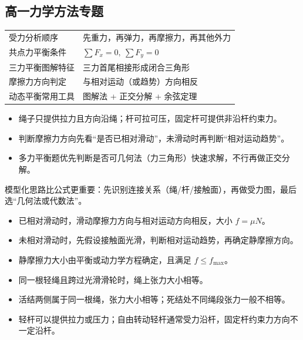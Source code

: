 \subsection{高一力学方法专题}
\begin{tabularx}{\columnwidth}{XX}
  受力分析顺序 & 先重力，再弹力，再摩擦力，再其他外力 \\
  共点力平衡条件 & $\sum F_x=0,\ \sum F_y=0$ \\
  三力平衡图解特征 & 三力首尾相接形成闭合三角形 \\
  摩擦力方向判定 & 与相对运动（或趋势）方向相反 \\
  动态平衡常用工具 & 图解法 + 正交分解 + 余弦定理 \\
\end{tabularx}

\begin{formulanotebox}
\begin{itemize}[leftmargin=1.5em]
  \item 绳子只提供拉力且方向沿绳；杆可拉可压，固定杆可提供非沿杆约束力。
  \item 判断摩擦力方向先看“是否已相对滑动”，未滑动时再判断“相对运动趋势”。
  \item 多力平衡题优先判断是否可几何法（力三角形）快速求解，不行再做正交分解。
\end{itemize}
\end{formulanotebox}

\begin{keypointbox}
模型化思路比公式更重要：先识别连接关系（绳/杆/接触面），再做受力图，最后选“几何法或代数法”。
\end{keypointbox}

\begin{casetypebox}[title={\strut\textcolor{white}{\bfseries 常见题型：摩擦力方向与大小判定}}]
\begin{itemize}[leftmargin=1.5em]
  \item 已相对滑动时，滑动摩擦力方向与相对运动方向相反，大小 $f=\mu N$。
  \item 未相对滑动时，先假设接触面光滑，判断相对运动趋势，再确定静摩擦方向。
  \item 静摩擦力大小由平衡或动力学方程确定，且满足 $f\le f_{\max}$。
\end{itemize}
\end{casetypebox}

\begin{casetypebox}[title={\strut\textcolor{white}{\bfseries 常见题型：绳杆模型}}]
\begin{itemize}[leftmargin=1.5em]
  \item 同一根轻绳且跨过光滑滑轮时，绳上张力大小相等。
  \item 活结两侧属于同一根绳，张力大小相等；死结处不同绳段张力一般不相等。
  \item 轻杆可以提供拉力或压力；自由转动轻杆通常受力沿杆，固定杆约束力方向不一定沿杆。
\end{itemize}
\end{casetypebox}

